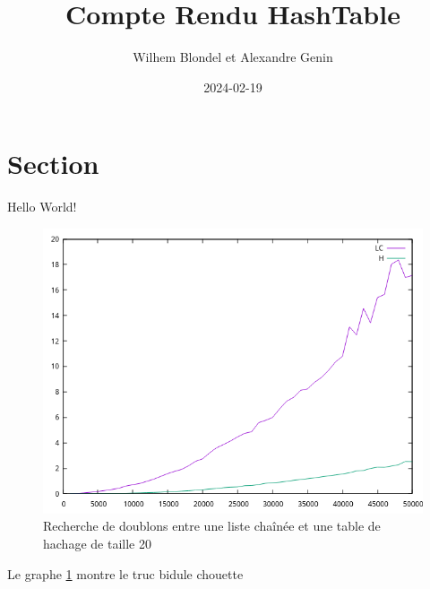 \documentclass{article}
\title{Compte Rendu HashTable}
\date{2024-02-19}
\author{Wilhem Blondel et Alexandre Genin}
\begin{document}
    \maketitle
    \newpage

    \section{Section}    
    Hello World!

    \begin{figure}
        \includegraphics[width=\linewidth]{graph.png}
        \caption{Recherche de doublons entre une liste chaînée et une table de hachage de taille 20}
        \label{fig:graph20}
    \end{figure}

    Le graphe \ref{fig:graph20} montre le truc bidule chouette
        
\end{document}
